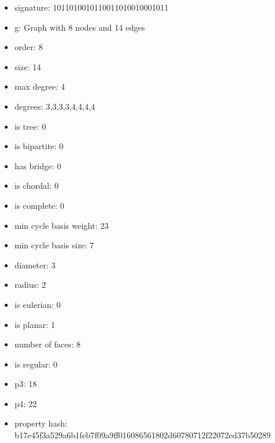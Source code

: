 \begin{itemize}
\item signature: 1011010010110011010010001011
\item g: Graph with 8 nodes and 14 edges
\item order: 8
\item size: 14
\item max degree: 4
\item degrees: 3,3,3,3,4,4,4,4
\item is tree: 0
\item is bipartite: 0
\item has bridge: 0
\item is chordal: 0
\item is complete: 0
\item min cycle basis weight: 23
\item min cycle basis size: 7
\item diameter: 3
\item radius: 2
\item is eulerian: 0
\item is planar: 1
\item number of faces: 8
\item is regular: 0
\item p3: 18
\item p4: 22
\item property hash: b17e45f3a529a6b1feb7f09a9ff016086561802d60780712f22072ed37b50289
\end{itemize}
\newpage
\begin{figure}
\end{figure}
